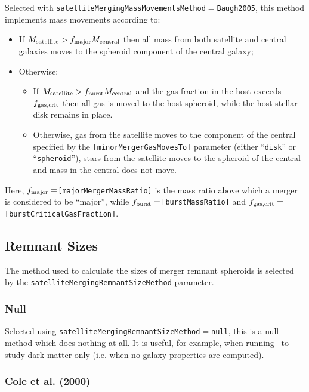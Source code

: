Selected with {\tt satelliteMergingMassMovementsMethod}$=${\tt Baugh2005}, this method implements mass movements according to:
\begin{itemize}
 \item If $M_{\rm satellite} > f_{\rm major} M_{\rm central}$ then all mass from both satellite and central galaxies moves to the spheroid \gls{component} of the central galaxy;
 \item Otherwise:
 \begin{itemize}
  \item If $M_{\rm satellite} > f_{\rm burst} M_{\rm central}$ and the gas fraction in the host exceeds $f_{\rm gas,crit}$ then all gas is moved to the host spheroid, while the host stellar disk remains in place.
  \item Otherwise, gas from the satellite moves to the \gls{component} of the central specified by the {\tt [minorMergerGasMovesTo]} parameter (either ``{\tt disk}'' or ``{\tt spheroid}''), stars from the satellite moves to the spheroid of the central and mass in the central does not move.
 \end{itemize}
\end{itemize}
Here, $f_{\rm major}=${\tt [majorMergerMassRatio]} is the mass ratio above which a merger is considered to be ``major'', while $f_{\rm burst}=${\tt [burstMassRatio]} and $f_{\rm gas,crit}=${\tt [burstCriticalGasFraction]}.

\subsection{Remnant Sizes}

The method used to calculate the sizes of merger remnant spheroids is selected by the {\tt satelliteMergingRemnantSizeMethod} parameter.

\subsubsection{Null}

Selected using {\tt satelliteMergingRemnantSizeMethod}$=${\tt null}, this is a null method which does nothing at all. It is useful, for example, when running \glc\ to study dark matter only (i.e. when no galaxy properties are computed).

\subsubsection{Cole et al. (2000)}\label{sec:MergerRemnantSizeCole2000}

